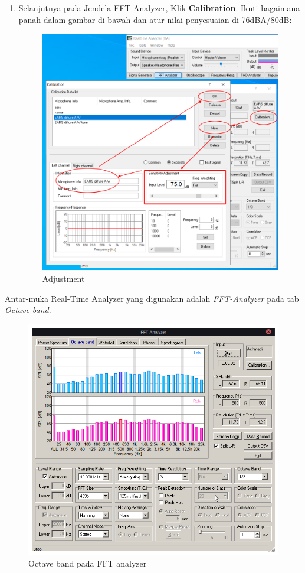 \documentclass[12pt]{book}
\begin{document}
\begin{enumerate}
    	\newpage
    	\item Selanjutnya pada Jendela FFT Analyzer, Klik \textbf{Calibration}.
    	Ikuti bagaimana panah dalam gambar di bawah dan atur nilai penyesuaian di 76dBA/80dB:

    	\begin{figure}[!ht]
    		\centering
    		\includegraphics[width=\textwidth]{images/kalibrasi/adjustment}
    		\caption{Adjustment}
    	\end{figure}
    \end{enumerate}

	\newpage
	Antar-muka Real-Time Analyzer yang digunakan adalah \textit{FFT-Analyzer} pada tab \textit{Octave band}.

	\begin{figure}[!ht]
		\centering
		\includegraphics[width=\textwidth]{images/kalibrasi/fft}
		\caption{Octave band pada FFT analyzer}
	\end{figure}
\end{document}
